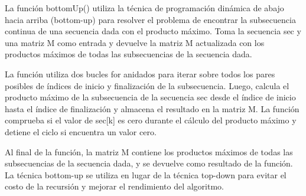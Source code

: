 \documentclass[11pt]{article}
\begin{document}
La función bottomUp() utiliza la técnica de programación dinámica de
abajo hacia arriba (bottom-up) para resolver el problema de encontrar la
subsecuencia continua de una secuencia dada con el producto máximo. Toma
la secuencia sec y una matriz M como entrada y devuelve la matriz M
actualizada con los productos máximos de todas las subsecuencias de la
secuencia dada.

La función utiliza dos bucles for anidados para iterar sobre todos los
pares posibles de índices de inicio y finalización de la subsecuencia.
Luego, calcula el producto máximo de la subsecuencia de la secuencia sec
desde el índice de inicio hasta el índice de finalización y almacena el
resultado en la matriz M. La función comprueba si el valor de sec{[}k{]}
es cero durante el cálculo del producto máximo y detiene el ciclo si
encuentra un valor cero.

Al final de la función, la matriz M contiene los productos máximos de
todas las subsecuencias de la secuencia dada, y se devuelve como
resultado de la función. La técnica bottom-up se utiliza en lugar de la
técnica top-down para evitar el costo de la recursión y mejorar el
rendimiento del algoritmo.
\end{document}
